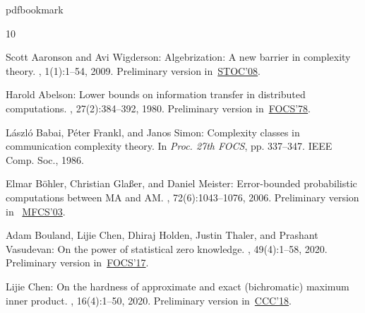 \newcommand{\prelim}{Preliminary version in\ }
\providecommand{\bibhead}[1]{}
\expandafter\ifx\csname pdfbookmark\endcsname\relax%
  \providecommand{\tocrefpdfbookmark}{}
\else\providecommand{\tocrefpdfbookmark}{%
   \hypertarget{tocreferences}{}%
   \pdfbookmark[1]{References}{tocreferences}}%
\fi

\tocrefpdfbookmark
\begin{thebibliography}{10}

\bibhead{AW08_Alg}
{\sc Scott Aaronson and Avi Wigderson}: Algebrization: {A} new barrier in
  complexity theory.
, 1(1):1--54, 2009.
\newblock \prelim \href{https://doi.org/10.1145/1374376.1374481}{STOC'08}.
\newblock [\epfmtdoi{10.1145/1490270.1490272}]

\bibhead{A78_Lo}
{\sc Harold Abelson}: Lower bounds on information transfer in distributed
  computations.
, 27(2):384--392, 1980.
\newblock \prelim \href{https://doi.org/10.1109/SFCS.1978.22}{FOCS'78}.
\newblock [\epfmtdoi{10.1145/322186.322200}]

\bibhead{BFS86_Com}
{\sc L{\'a}szl{\'o} Babai, P{\'e}ter Frankl, and Janos Simon}: Complexity
  classes in communication complexity theory.
\newblock In {\em Proc. 27th FOCS}, pp. 337--347. IEEE Comp. Soc., 1986.

\bibhead{BGM06_Err}
{\sc Elmar B\"ohler, Christian Gla{\ss}er, and Daniel Meister}: Error-bounded
  probabilistic computations between {MA} and {AM}.
, 72(6):1043--1076, 2006.
\newblock \prelim
  \href{https://doi.org/10.1007/978-3-540-45138-9\_19}{MFCS'03}.

\bibhead{BCHTV17_On}
{\sc Adam Bouland, Lijie Chen, Dhiraj Holden, Justin Thaler, and Prashant
  Vasudevan}: On the power of statistical zero knowledge.
, 49(4):1--58, 2020.
\newblock \prelim \href{https://doi.org/10.1109/FOCS.2017.71}{FOCS'17}.

\bibhead{C18_On}
{\sc Lijie Chen}: On the hardness of approximate and exact (bichromatic)
  maximum inner product.
, 16(4):1--50, 2020.
\newblock \prelim \href{https://doi.org/10.4230/LIPIcs.CCC.2018.14}{CCC'18}.


\end{thebibliography}
